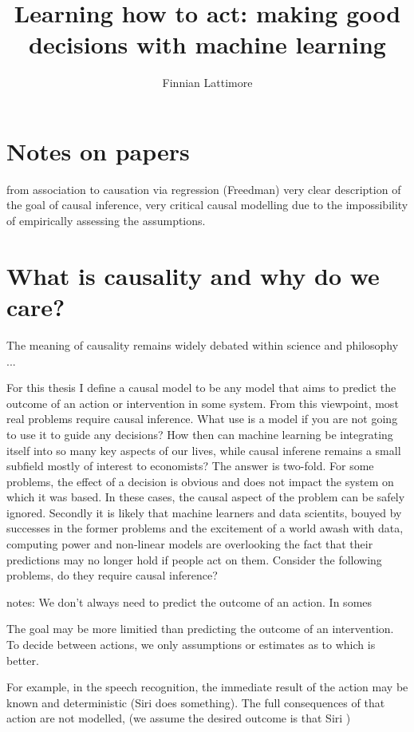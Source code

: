 \documentclass[11pt,a4paper]{article}
\author{Finnian Lattimore}
\title{Learning how to act: making good decisions with machine learning}
\begin{document}
\def\ci{\perp\!\!\!\perp} %
\newtheorem{theorem}{Theorem}[section]
\newtheorem{definition}{Definition}[section]
\maketitle

\section*{Notes on papers}
from association to causation via regression (Freedman)
very clear description of the goal of causal inference, very critical causal modelling due to the impossibility of empirically assessing the assumptions.

 

\section*{What is causality and why do we care?}


The meaning of causality remains widely debated within science and philosophy ...

 
For this thesis I define a causal model to be any model that aims to predict the outcome of an action or intervention in some system. From this viewpoint, most real problems require causal inference. What use is a model if you are not going to use it to guide any decisions? How then can machine learning be integrating itself into so many key aspects of our lives, while causal inferene remains a small subfield mostly of interest to economists? The answer is two-fold. For some problems, the effect of a decision is obvious and does not impact the system on which it was based. In these cases, the causal aspect of the problem can be safely ignored. Secondly it is likely that machine learners and data scientits, bouyed by successes in the former problems and the excitement of a world awash with data, computing power and non-linear models are overlooking the fact that their predictions may no longer hold if people act on them. Consider the following problems, do they require causal inference?

notes: We don't always need to predict the outcome of an action. In somes

The goal may be more limitied than predicting the outcome of an intervention. To decide between actions, we only assumptions or estimates as to which is better. 
 
For example, in the speech recognition, the immediate result of the action may be known and deterministic (Siri does something). The full consequences of that action are not modelled, (we assume the desired outcome is that Siri )
\end{document}
